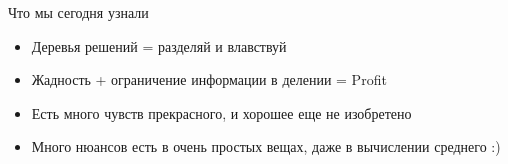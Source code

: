 \documentclass[14pt, fleqn, xcolor={dvipsnames, table}]{beamer}
\begin{document}
\begin{frame}{Что мы сегодня узнали}
\begin{itemize}
  \item Деревья решений = разделяй и влавствуй
  \item Жадность + ограничение информации в делении = Profit
  \item Есть много чувств прекрасного, и хорошее еще не изобретено
  \item Много нюансов есть в очень простых вещах, даже в вычислении среднего :)
\end{itemize}
\end{frame}
\end{document}
